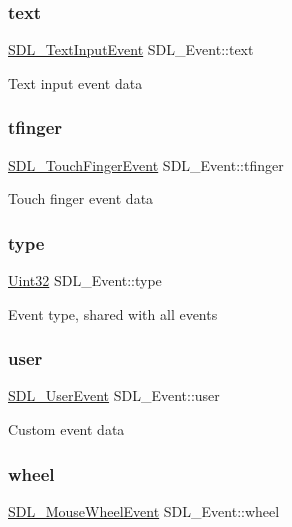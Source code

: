 \subsubsection{\texorpdfstring{text}{text}}
{\footnotesize\ttfamily \mbox{\hyperlink{struct_s_d_l___text_input_event}{S\+D\+L\+\_\+\+Text\+Input\+Event}} S\+D\+L\+\_\+\+Event\+::text}

Text input event data \mbox{\label{union_s_d_l___event_ab18d7d60794cb056948ffa58541bc3c5}} 
\subsubsection{\texorpdfstring{tfinger}{tfinger}}
{\footnotesize\ttfamily \mbox{\hyperlink{struct_s_d_l___touch_finger_event}{S\+D\+L\+\_\+\+Touch\+Finger\+Event}} S\+D\+L\+\_\+\+Event\+::tfinger}

Touch finger event data \mbox{\label{union_s_d_l___event_a237648bec242d2d5835f1a4250ddfa46}} 
\subsubsection{\texorpdfstring{type}{type}}
{\footnotesize\ttfamily \mbox{\hyperlink{_s_d_l__stdinc_8h_add440eff171ea5f55cb00c4a9ab8672d}{Uint32}} S\+D\+L\+\_\+\+Event\+::type}

Event type, shared with all events \mbox{\label{union_s_d_l___event_ab7c394e3ce7bf1e4f8d68bc0e9f1b042}} 
\subsubsection{\texorpdfstring{user}{user}}
{\footnotesize\ttfamily \mbox{\hyperlink{struct_s_d_l___user_event}{S\+D\+L\+\_\+\+User\+Event}} S\+D\+L\+\_\+\+Event\+::user}

Custom event data \mbox{\label{union_s_d_l___event_a267d3f550715519ec90a81ccd0e6cbda}} 
\subsubsection{\texorpdfstring{wheel}{wheel}}
{\footnotesize\ttfamily \mbox{\hyperlink{struct_s_d_l___mouse_wheel_event}{S\+D\+L\+\_\+\+Mouse\+Wheel\+Event}} S\+D\+L\+\_\+\+Event\+::wheel}


